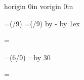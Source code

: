 \emergencystretch=0pt
\hfuzz=0pt

\def\firstnoindent{\global\everypar={\wipeeverypar\setbox7=\lastbox}}
\def\wipeeverypar{\global\everypar={}}

{}


\pagewidth=150mm	
\pageheight=225mm

\pdfvariable horigin 0in	
\pdfvariable vorigin 0in

\hoffset=\dimexpr(\pagewidth/9)\relax	
\voffset=\dimexpr(\pageheight/9)\relax
\advance\voffset by -\topskip
\advance\voffset by 1ex


\topskip=\baselineskip %

\hsize=\dimexpr(6\pagewidth/9)
\vsize=\topskip \advance\vsize by 30\baselineskip

\newdimen\originalvsize \originalvsize=\vsize

\def\adjustpage#1#2{%
	\expandafter\xdef\csname ap:#1\endcsname{#2}
	\ifnum #1=1
		\setvsize
	\fi
}

\def\setvsize{%
	\global\vsize=\originalvsize
	\ifcsname ap:\the\pageno\endcsname
		\global\advance \vsize by \csname ap:\the\pageno\endcsname \baselineskip
	\fi
}



\def\makeheadlineplain{%
	\vbox to0pt{%
		\vskip-22.5pt
  		\line{%
  			\vbox to8.5pt{}%
  			\the\headline
  		}%
  		\vss
  	}
	\nointerlineskip
}

\def\makeheadline{%
    \vbox to0pt{%
        \vss
        \hbox to\hsize{%
            \the\headline
        }%
        \vskip-\topskip
        \vskip0.5\baselineskip %
        \hbox{}%
    }%
    \nointerlineskip
}

